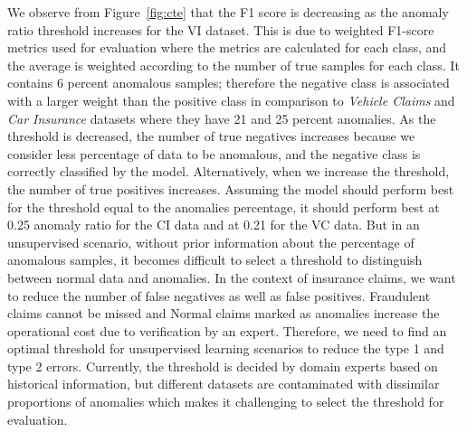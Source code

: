 \documentclass{article}
\begin{document}
We observe from Figure~\ref{fig:cte} that the F1 score is decreasing as the anomaly ratio threshold increases for the VI dataset. This is due to weighted F1-score metrics used for evaluation where the metrics are calculated for each class, and the average is weighted according to the number of true samples for each class. It contains 6 percent anomalous samples; therefore the negative class is associated with a larger weight than the positive class in comparison to  \textit{Vehicle Claims} and \textit{Car Insurance} datasets where they have 21 and 25 percent anomalies. As the threshold is decreased, the number of true negatives increases because we consider less percentage of data to be anomalous, and the negative class is correctly classified by the model. Alternatively, when we increase the threshold, the number of true positives increases. Assuming the model should perform best for the threshold equal to the anomalies percentage, it should perform best at 0.25 anomaly ratio for the CI data and at 0.21 for the VC data. But in an unsupervised scenario, without prior information about the percentage of anomalous samples, it becomes difficult to select a threshold to distinguish between normal data and anomalies. In the context of insurance claims, we want to reduce the number of false negatives as well as false positives. Fraudulent claims cannot be missed and Normal claims marked as anomalies increase the operational cost due to verification by an expert. Therefore, we need to find an optimal threshold for unsupervised learning scenarios to reduce the type 1 and type 2 errors. Currently, the threshold is decided by domain experts based on historical information, but different datasets are contaminated with dissimilar proportions of anomalies which makes it challenging to select the threshold for evaluation. 
\end{document}
